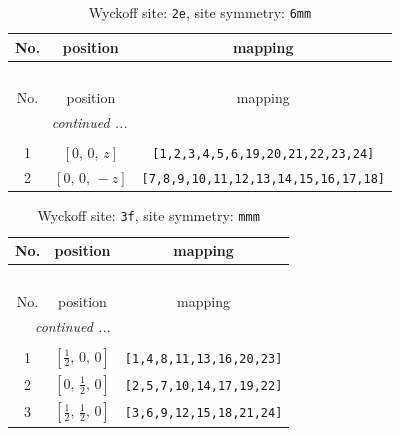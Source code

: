 \documentclass[fleqn,8pt]{jsarticle}
\begin{document}
\begin{longtable}{ccc}
\caption{Wyckoff site: {\tt 2e}, site symmetry: {\tt 6mm}}
 \\
 \hline \hline
No. & position & mapping \\ \hline \endfirsthead

\multicolumn{2}{l}{\tablename\ \thetable{}} \\
 \hline \hline
No. & position & mapping \\ \hline \endhead

 \hline \hline
\multicolumn{2}{r}{\footnotesize\it continued ...} \\ \endfoot

 \hline \hline
\multicolumn{2}{r}{} \\ \endlastfoot

1 & $\left[ 0,\, 0,\, z \right]$ & {\tt [1,2,3,4,5,6,19,20,21,22,23,24]} \\ \hline
2 & $\left[ 0,\, 0,\, - z \right]$ & {\tt [7,8,9,10,11,12,13,14,15,16,17,18]} \\
\end{longtable}
\renewcommand{\arraystretch}{1.2}
\begin{longtable}{ccc}
\caption{Wyckoff site: {\tt 3f}, site symmetry: {\tt mmm}}
 \\
 \hline \hline
No. & position & mapping \\ \hline \endfirsthead

\multicolumn{2}{l}{\tablename\ \thetable{}} \\
 \hline \hline
No. & position & mapping \\ \hline \endhead

 \hline \hline
\multicolumn{2}{r}{\footnotesize\it continued ...} \\ \endfoot

 \hline \hline
\multicolumn{2}{r}{} \\ \endlastfoot

1 & $\left[ \frac{1}{2},\, 0,\, 0 \right]$ & {\tt [1,4,8,11,13,16,20,23]} \\ \hline
2 & $\left[ 0,\, \frac{1}{2},\, 0 \right]$ & {\tt [2,5,7,10,14,17,19,22]} \\ \hline
3 & $\left[ \frac{1}{2},\, \frac{1}{2},\, 0 \right]$ & {\tt [3,6,9,12,15,18,21,24]} \\
\end{longtable}
\renewcommand{\arraystretch}{1.2}
\end{document}
